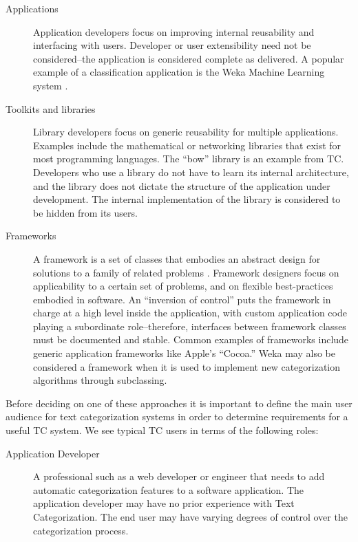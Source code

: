 \begin{singlespace}
\begin{description}
\item[Applications] Application developers focus on improving internal
reusability and interfacing with users.  Developer or user
extensibility need not be considered--the application is considered
complete as delivered.  A popular example of a classification
application is the Weka Machine Learning system \cite{weka:99}.

\item[Toolkits and libraries] Library developers focus on generic
reusability for multiple applications.  Examples include the
mathematical or networking libraries that exist for most programming
languages.  The ``bow'' library \cite{bow:96} is an example from TC.
Developers who use a library do not have to learn its internal
architecture, and the library does not dictate the structure of the
application under development.\cite{fayad:99} The internal
implementation of the library is considered to be hidden from its
users.

\item[Frameworks] A framework is a set of classes that embodies an
abstract design for solutions to a family of related problems
\cite[Ch. 2]{fayad:99}.  Framework designers focus on applicability to
a certain set of problems, and on flexible best-practices embodied in
software.  An ``inversion of control'' puts the framework in charge at
a high level inside the application, with custom application code
playing a subordinate role--therefore, interfaces between framework
classes must be documented and stable.  Common examples of frameworks include
generic application frameworks like Apple's ``Cocoa.''  Weka may also
be considered a framework when it is used to implement new
categorization algorithms through subclassing.
\end{description}


Before deciding on one of these approaches it is important to define
the main user audience for text categorization systems in order to determine
 requirements for a useful TC system.  We see typical TC users in terms of the following
roles:

\begin{description}
\item[Application Developer] A professional such as a web developer or
engineer that needs to add automatic categorization features to a
software application. The application developer may have no prior
experience with Text Categorization.  The end user may have varying
degrees of control over the categorization process.


\end{description}
\end{singlespace}
